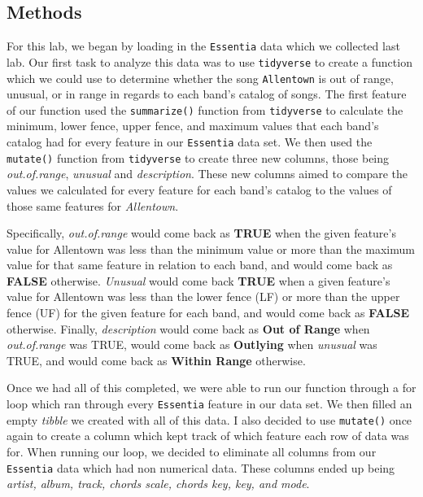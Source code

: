 \documentclass{article}\usepackage[]{graphicx}\usepackage[]{xcolor}
\begin{document}
\begin{multicols}{2}
\section{Methods}
For this lab, we began by loading in the \texttt{Essentia} \citep{Essentia} data which we collected last lab. Our first task to analyze this data was to use \texttt{tidyverse} \citep{tidyverse} to create a function which we could use to determine whether the song \texttt{Allentown} is out of range, unusual, or in range in regards to each band's catalog of songs. The first feature of our function used the \texttt{summarize()} function from \texttt{tidyverse} to calculate the minimum, lower fence, upper fence, and maximum values that each band's catalog had for every feature in our \texttt{Essentia} data set. We then used the \texttt{mutate()} function from \texttt{tidyverse} to create three new columns, those being \textit{out.of.range}, \textit{unusual} and \textit{description}. These new columns aimed to compare the values we calculated for every feature for each band's catalog to the values of those same features for \textit{Allentown}. 
\par\indent
Specifically, \textit{out.of.range} would come back as \textbf{TRUE} when the given feature's value for Allentown was less than the minimum value or more than the maximum value for that same feature in relation to each band, and would come back as \textbf{FALSE} otherwise. \textit{Unusual} would come back \textbf{TRUE} when a given feature's value for Allentown was less than the lower fence (LF) or more than the upper fence (UF) for the given feature for each band, and would come back as \textbf{FALSE} otherwise. Finally, \textit{description} would come back as \textbf{Out of Range} when \textit{out.of.range} was TRUE, would come back as \textbf{Outlying} when \textit{unusual} was TRUE, and would come back as \textbf{Within Range} otherwise.
\par\indent
Once we had all of this completed, we were able to run our function through a for loop which ran through every \texttt{Essentia} feature in our data set. We then filled an empty \textit{tibble} we created with all of this data. I also decided to use \texttt{mutate()} once again to create a column which kept track of which feature each row of data was for. When running our loop, we decided to eliminate all columns from our \texttt{Essentia} data which had non numerical data. These columns ended up being \textit{artist, album, track, chords scale, chords key, key, and mode}.
\par\indent

\end{multicols}
\end{document}
